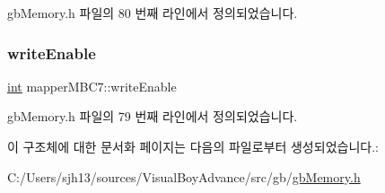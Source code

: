 gb\+Memory.\+h 파일의 80 번째 라인에서 정의되었습니다.

\mbox{\label{structmapper_m_b_c7_a8885a4983e918c11894d242c623ee4ad}} 
\subsubsection{\texorpdfstring{write\+Enable}{writeEnable}}
{\footnotesize\ttfamily \mbox{\hyperlink{_util_8cpp_a0ef32aa8672df19503a49fab2d0c8071}{int}} mapper\+M\+B\+C7\+::write\+Enable}



gb\+Memory.\+h 파일의 79 번째 라인에서 정의되었습니다.



이 구조체에 대한 문서화 페이지는 다음의 파일로부터 생성되었습니다.\+:\begin{DoxyCompactItemize}
\item 
C\+:/\+Users/sjh13/sources/\+Visual\+Boy\+Advance/src/gb/\mbox{\hyperlink{gb_memory_8h}{gb\+Memory.\+h}}\end{DoxyCompactItemize}
